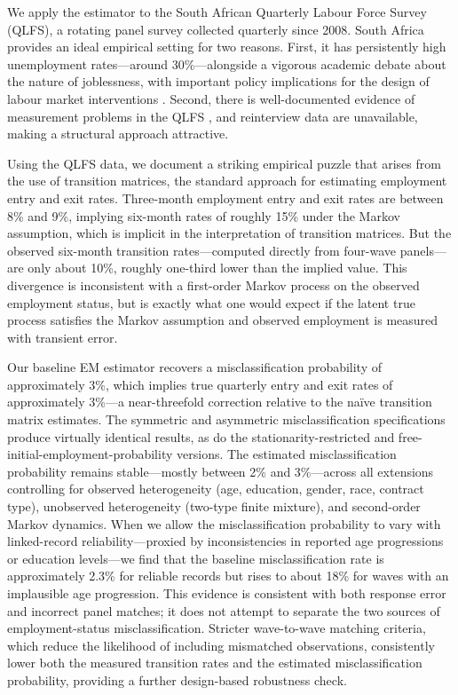 We apply the estimator to the South African Quarterly Labour Force Survey (QLFS),
a rotating panel survey collected quarterly since 2008. South Africa provides
an ideal empirical setting for two reasons. First, it has persistently high
unemployment rates---around 30\%---alongside a vigorous academic debate about
the nature of joblessness, with important policy implications for the design of
labour market interventions \citep{banerjee2008,nattrass2000,burgervonfintel2014}.
Second, there is well-documented evidence of measurement problems in the QLFS
\citep{burger2016,lechtenfeld2014}, and reinterview data are unavailable,
making a structural approach attractive.

Using the QLFS data, we document a striking empirical puzzle that arises from
the use of transition matrices, the standard approach for estimating
employment entry and exit rates. 
Three-month employment entry and exit rates are
between 8\% and 9\%, implying six-month rates of roughly 15\% under the Markov
assumption, which is implicit in the interpretation of transition matrices. 
But the observed six-month transition rates---computed directly from
four-wave panels---are only about 10\%, roughly one-third lower than the implied
value. This divergence is inconsistent with a first-order Markov process on
the observed employment status, but is exactly what one would expect if the
latent true process satisfies the Markov assumption and observed employment is
measured with transient error.

Our baseline EM estimator recovers a misclassification probability of
approximately 3\%, which implies true quarterly entry and exit rates of
approximately 3\%---a near-threefold correction relative to the na\"ive transition
matrix estimates. The symmetric and asymmetric misclassification specifications produce
virtually identical results, as do the stationarity-restricted and
free-initial-employment-probability versions. The estimated misclassification
probability remains stable---mostly between 2\% and 3\%---across all extensions
controlling for observed heterogeneity (age, education, gender, race, contract
type), unobserved heterogeneity (two-type finite mixture), and second-order
Markov dynamics. When we allow the misclassification probability to vary with
linked-record reliability---proxied by inconsistencies in reported age
progressions or education levels---we find that the baseline misclassification
rate is approximately 2.3\% for reliable records but rises to about 18\%
for waves with an implausible age progression. This evidence is consistent with
both response error and incorrect panel matches; it does not attempt to separate
the two sources of employment-status misclassification.
Stricter wave-to-wave matching criteria, which reduce the likelihood of
including mismatched observations, consistently lower both the measured
transition rates and the estimated misclassification probability, providing
a further design-based robustness check.

